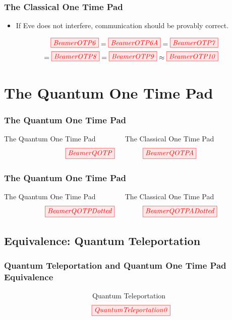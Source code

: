 \documentclass[]{beamer}
\begin{document}
\begin{frame}
	\frametitle{The Classical One Time Pad}
	\begin{itemize}
	\item If Eve does not interfere, communication should be
	provably correct.
	\end{itemize}
\begin{equation}
	\begin{split}
	\tikzfig{BeamerOTP6} = \tikzfig{BeamerOTP6A} = \tikzfig{BeamerOTP7} \\ = \tikzfig{BeamerOTP8} = \tikzfig{BeamerOTP9} \approx \tikzfig{BeamerOTP10}
	\end{split} 
\end{equation}
\end{frame}

\section{The Quantum One Time Pad}
\begin{frame}
	\centering 
	\Huge
\end{frame}
\begin{frame}
	\frametitle{The Quantum One Time Pad}
	The Quantum One Time Pad ~~~~~~~ The Classical One Time Pad
	\begin{equation}
	\tikzfig{BeamerQOTP} ~~~~~~~~~~~~ \tikzfig{BeamerQOTPA}
	\end{equation}
\end{frame}

\begin{frame}
	\frametitle{The Quantum One Time Pad}
	The Quantum One Time Pad ~~~~~~~ The Classical One Time Pad
	\begin{equation}
	\tikzfig{BeamerQOTPDotted} ~~~~~~~~~~~~ \tikzfig{BeamerQOTPADotted}
	\end{equation}
\end{frame}

\subsection{Equivalence: Quantum Teleportation}

\begin{frame}
	\frametitle{Quantum Teleportation and Quantum One Time Pad Equivalence}
	~~~~~~~~~~~~~~~~~~~~~~~~~Quantum Teleportation
	\begin{equation}
	\tikzfig{QuantumTeleportation0}
	\end{equation}
\end{frame}
\end{document}
